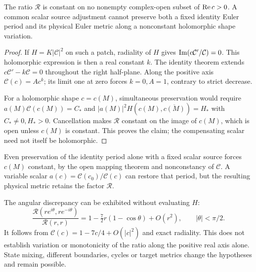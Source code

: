 \begin{proposition}
\label{shape:ratio}
The ratio $\mathcal R$ is constant on no nonempty complex-open
subset of $\operatorname{Re} c>0$. A common scalar source adjustment cannot
preserve both a fixed identity Euler period and its physical Euler
metric along a nonconstant holomorphic shape variation.
\end{proposition}
\begin{proof}
If $H=K|\mathcal C|^2$ on such a patch, radiality of $H$ gives
$\operatorname{Im}(c\mathcal C'/\mathcal C)=0$. This holomorphic expression is
then a real constant $k$. The identity theorem extends
$c\mathcal C'-k\mathcal C=0$ throughout the right half-plane.
Along the positive axis $\mathcal C(c)=Ac^k$; its limit one at
zero forces $k=0,A=1$, contrary to strict decrease.

For a holomorphic shape $c=c(M)$, simultaneous preservation would
require $a(M)\mathcal C(c(M))=C_*$ and
$|a(M)|^2H(c(M),\overline{c(M)})=H_*$ with $C_*\ne0,H_*>0$.
Cancellation makes $\mathcal R$ constant on the image of $c(M)$,
which is open unless $c(M)$ is constant. This proves the claim;
the compensating scalar need not itself be holomorphic.
\end{proof}
Even preservation of the identity period alone with a fixed scalar
source forces $c(M)$ constant, by the open mapping theorem and
nonconstancy of $\mathcal C$. A variable scalar
$a(c)=\mathcal C(c_0)/\mathcal C(c)$ can restore that period, but
the resulting physical metric retains the factor $\mathcal R$.

The angular discrepancy can be exhibited without evaluating $H$:
\begin{equation}\label{shape:angular-ratio}
\frac{\mathcal R(re^{i\theta},re^{-i\theta})}{\mathcal R(r,r)}
=1-\tfrac72r(1-\cos\theta)+O(r^2),
\qquad |\theta|<\pi/2.
\end{equation}
It follows from $\mathcal C(c)=1-7c/4+O(|c|^2)$ and exact radiality.
This does not establish variation or monotonicity of the ratio along
the positive real axis alone. State mixing, different boundaries,
cycles or target metrics change the hypotheses and remain possible.
